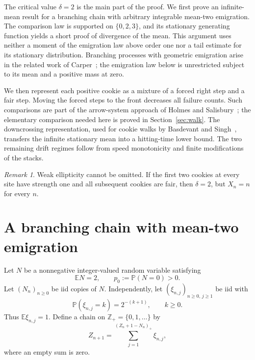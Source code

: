 \documentclass[11pt]{amsart}
\numberwithin{equation}{section}
\theoremstyle{remark}
\newtheorem{remark}[theorem]{Remark}
\newcommand{\E}{\mathbb E}
\newcommand{\Pp}{\mathbb P}
\newcommand{\Z}{\mathbb Z}
\begin{document}
The critical value $\delta=2$ is the main part of the proof. We first prove an infinite-mean result for a branching chain with arbitrary integrable mean-two emigration. The comparison law is supported on $\{0,2,3\}$, and its stationary generating function yields a short proof of divergence of the mean. This argument uses neither a moment of the emigration law above order one nor a tail estimate for its stationary distribution. Branching processes with geometric emigration arise in the related work of Carper~\cite{Carper26}; the emigration law below is unrestricted subject to its mean and a positive mass at zero.

We then represent each positive cookie as a mixture of a forced right step and a fair step. Moving the forced steps to the front decreases all failure counts. Such comparisons are part of the arrow-system approach of Holmes and Salisbury~\cite{HS12}; the elementary comparison needed here is proved in Section~\ref{sec:walk}. The downcrossing representation, used for cookie walks by Basdevant and Singh~\cite{BS08}, transfers the infinite stationary mean into a hitting-time lower bound. The two remaining drift regimes follow from speed monotonicity and finite modifications of the stacks.

\begin{remark}\label{rem:wel}
Weak ellipticity cannot be omitted. If the first two cookies at every site have strength one and all subsequent cookies are fair, then $\delta=2$, but $X_n=n$ for every $n$.
\end{remark}

\section{A branching chain with mean-two emigration}\label{sec:emigration}

Let $N$ be a nonnegative integer-valued random variable satisfying
\begin{equation}\label{eq:N}
 \E N=2,\qquad p_0:=\Pp(N=0)>0.
\end{equation}
Let $(N_n)_{n\ge0}$ be iid copies of $N$. Independently, let $(\xi_{n,j})_{n\ge0,\,j\ge1}$ be iid with
\begin{equation}\label{eq:geom}
 \Pp(\xi_{n,j}=k)=2^{-(k+1)},\qquad k\ge0.
\end{equation}
Thus $\E\xi_{n,j}=1$. Define a chain on $\Z_+=\{0,1,\ldots\}$ by
\begin{equation}\label{eq:chain}
 Z_{n+1}=\sum_{j=1}^{(Z_n+1-N_n)_+}\xi_{n,j},
\end{equation}
where an empty sum is zero.
\end{document}
